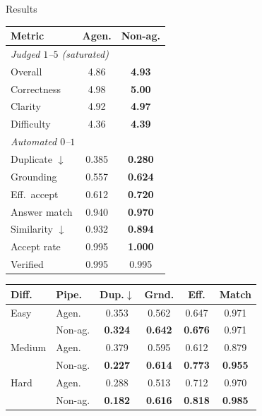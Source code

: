 \documentclass[final]{beamer}
\newcommand{\tbl}{\fontsize{24}{30}\selectfont}
\newcommand{\win}[1]{\textbf{\textcolor{LAgreen}{#1}}}
\begin{document}
\begin{frame}[t]
\begin{columns}[t]
\begin{column}{\colC}
\begin{block}{Results}
    \begin{minipage}[t]{0.44\colC}
      \centering
      {\tbl
      \begin{tabular}{lcc}
        \toprule
        \textbf{Metric} & \textbf{Agen.} & \textbf{Non-ag.} \\
        \midrule
        \multicolumn{3}{l}{\emph{Judged $1$--$5$ (saturated)}} \\
        Overall     & 4.86 & \win{4.93} \\
        Correctness & 4.98 & \win{5.00} \\
        Clarity     & 4.92 & \win{4.97} \\
        Difficulty  & 4.36 & \win{4.39} \\
        \midrule
        \multicolumn{3}{l}{\emph{Automated $0$--$1$}} \\
        Duplicate $\downarrow$  & 0.385 & \win{0.280} \\
        Grounding               & 0.557 & \win{0.624} \\
        Eff.\ accept            & 0.612 & \win{0.720} \\
        Answer match            & 0.940 & \win{0.970} \\
        Similarity $\downarrow$ & 0.932 & \win{0.894} \\
        Accept rate             & 0.995 & \win{1.000} \\
        Verified                & 0.995 & 0.995 \\
        \bottomrule
      \end{tabular}}
    \end{minipage}
    \hfill
    \begin{minipage}[t]{0.54\colC}
      \centering
      {\tbl\setlength{\tabcolsep}{4pt}
      \begin{tabular}{llcccc}
        \toprule
        \textbf{Diff.} & \textbf{Pipe.} & \textbf{Dup.}$\downarrow$
          & \textbf{Grnd.} & \textbf{Eff.} & \textbf{Match} \\
        \midrule
        Easy   & Agen.   & 0.353 & 0.562 & 0.647 & 0.971 \\
               & Non-ag. & \win{0.324} & \win{0.642} & \win{0.676} & 0.971 \\
        \midrule
        Medium & Agen.   & 0.379 & 0.595 & 0.612 & 0.879 \\
               & Non-ag. & \win{0.227} & \win{0.614} & \win{0.773} & \win{0.955} \\
        \midrule
        Hard   & Agen.   & 0.288 & 0.513 & 0.712 & 0.970 \\
               & Non-ag. & \win{0.182} & \win{0.616} & \win{0.818} & \win{0.985} \\
        \bottomrule
      \end{tabular}}


\end{minipage}
\end{block}
\end{column}
\end{columns}
\end{frame}
\end{document}
